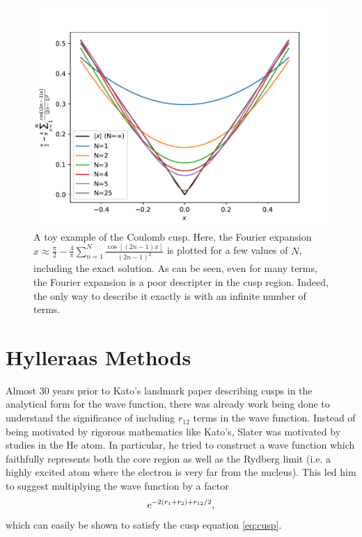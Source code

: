\begin{figure}[htbp]
    \centering
    \includegraphics{figures/explicit/cusp.pdf}
    \caption{A toy example of the Coulomb cusp. Here, the Fourier expansion $x\approx\frac{\pi}{2} - \frac {4}{\pi} \sum_{n=1}^N\frac{\cos[(2n-1)x]}{(2n-1)^2}$ is plotted for a few values of $N$, including the exact solution. As can be seen, even for many terms, the Fourier expansion is a poor descripter in the cusp region. Indeed, the only way to describe it exactly is with an infinite number of terms.}
    \label{fig:cusp}
\end{figure}

\section{Hylleraas Methods}

Almost 30 years prior to Kato's landmark paper describing cusps in the analytical form for the wave function, there was already work being done to understand the significance of including $r_{12}$ terms in the wave function. Instead of being motivated by rigorous mathematics like Kato's, Slater was motivated by studies in the He atom. In particular, he tried to construct a wave function which faithfully represents both the core region as well as the Rydberg limit (i.e. a highly excited atom where the electron is very far from the nucleus).\cite{kongExplicitly2011,grynbergIntroduction2010,slaterCentral1928,slaterNormal1928} This led him to suggest multiplying the wave function by a factor
\begin{equation}
    \mathrm{e}^{-2(r_1+r_2)+r_{12}/2},
\end{equation}
which can easily be shown to satisfy the cusp equation \eqref{eq:cusp}.

